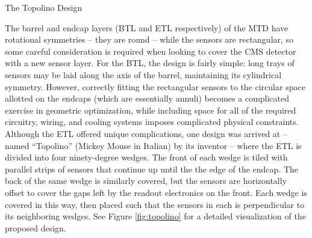 \begin{section}{The Topolino Design}

The barrel and endcap layers (BTL and ETL respectively) of the MTD have rotational symmetries -- they are round -- while the sensors are rectangular, so some careful consideration is required when looking to cover the CMS detector with a new sensor layer. For the BTL, the design is fairly simple: long trays of sensors may be laid along the axis of the barrel, maintaining its cylindrical symmetry. However, correctly fitting the rectangular sensors to the circular space allotted on the endcaps (which are essentially annuli) becomes a complicated exercise in geometric optimization, while including space for all of the required circuitry, wiring, and cooling systems imposes complicated physical constraints.  Although the ETL offered unique complications, one design was arrived at -- named ``Topolino'' (Mickey Mouse in Italian) by its inventor -- where the ETL is divided into four ninety-degree wedges. The front of each wedge is tiled with parallel strips of sensors that continue up until the the edge of the endcap. The back of the same wedge is similarly covered, but the sensors are horizontally offset to cover the gaps left by the readout electronics on the front. Each wedge is covered in this way, then placed such that the sensors in each is perpendicular to its neighboring wedges. See Figure \ref{fig:topolino} for a detailed visualization of the proposed design.


\end{section}
